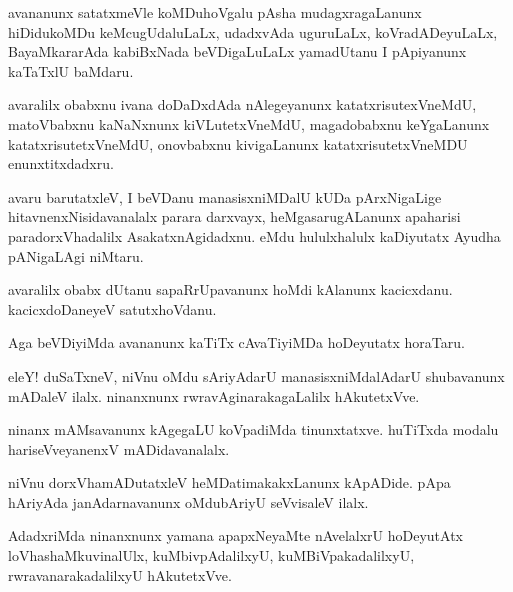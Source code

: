 \documentclass{article}
\begin{document}
\begin{mn}%
avananunx satatxmeVle koMDuhoVgalu pAsha mudagxragaLanunx hiDidukoMDu keMcugUdaluLaLx, 
udadxvAda uguruLaLx, koVradADeyuLaLx, BayaMkararAda kabiBxNada beVDigaLuLaLx yamadUtanu I 
pApiyanunx kaTaTxlU baMdaru.
\end{mn}

\begin{mn}%
avaralilx obabxnu ivana doDaDxdAda nAlegeyanunx katatxrisutexVneMdU, matoVbabxnu 
kaNaNxnunx kiVLutetxVneMdU, magadobabxnu keYgaLanunx katatxrisutetxVneMdU, onovbabxnu 
kivigaLanunx katatxrisutetxVneMDU enunxtitxdadxru.
\end{mn}

\begin{mn}%
avaru barutatxleV, I beVDanu manasisxniMDalU kUDa pArxNigaLige hitavnenxNisidavanalalx parara
darxvayx, heMgasarugALanunx apaharisi paradorxVhadalilx AsakatxnAgidadxnu. eMdu hululxhalulx
kaDiyutatx Ayudha pANigaLAgi niMtaru.
\end{mn}

\begin{mn}%
avaralilx obabx dUtanu sapaRrUpavanunx hoMdi kAlanunx kacicxdanu. kacicxdoDaneyeV 
satutxhoVdanu.
\end{mn}

\begin{mn}%
Aga beVDiyiMda avananunx kaTiTx cAvaTiyiMDa hoDeyutatx horaTaru.
\end{mn}

\begin{mn}%
eleY! duSaTxneV, niVnu oMdu sAriyAdarU manasisxniMdalAdarU shubavanunx mADaleV ilalx. 
ninanxnunx rwravAginarakagaLalilx hAkutetxVve.
\end{mn}

\begin{mn}%
ninanx mAMsavanunx kAgegaLU koVpadiMda tinunxtatxve. huTiTxda modalu hariseVveyanenxV 
mADidavanalalx.
\end{mn}

\begin{mn}%
niVnu dorxVhamADutatxleV heMDatimakakxLanunx kApADide. pApa hAriyAda janAdarnavanunx 
oMdubAriyU seVvisaleV ilalx.
\end{mn}

\begin{mn}%
AdadxriMda ninanxnunx yamana apapxNeyaMte nAvelalxrU hoDeyutAtx loVhashaMkuvinalUlx, 
kuMbivpAdalilxyU, kuMBiVpakadalilxyU, rwravanarakadalilxyU hAkutetxVve.
\end{mn}
\end{document}
